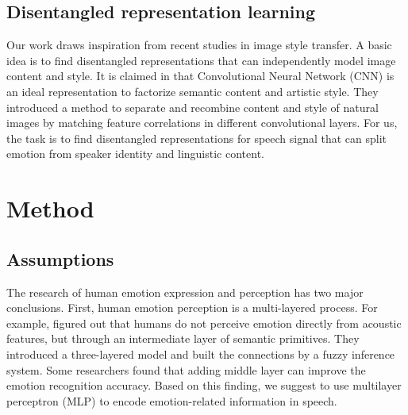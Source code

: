 \documentclass{article}
\begin{document}

\subsection{Disentangled representation learning}
Our work draws inspiration from recent studies in image style transfer. A basic idea is to find disentangled representations that can independently model image content and style. It is claimed in \cite{gatys2016image} that Convolutional Neural Network (CNN) is an ideal representation to factorize semantic content and artistic style. They introduced a method to separate and recombine content and style of natural images by matching feature correlations in different convolutional layers. For us, the task is to find disentangled representations for speech signal that can split emotion from speaker identity and linguistic content.





\section{Method}
\label{sec:method}

\subsection{Assumptions}
The research of human emotion expression and perception has two major conclusions.
First, human emotion perception is a multi-layered process. For example, \cite{huang2008three} figured out that humans do not perceive emotion directly from acoustic features, but through an intermediate layer of semantic primitives. They introduced a three-layered model and built the connections by a fuzzy inference system. Some researchers found that adding middle layer can improve the emotion recognition accuracy. Based on this finding, we suggest to use multilayer perceptron (MLP) to encode emotion-related information in speech.
\end{document}
